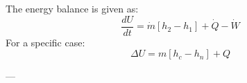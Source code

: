 The energy balance is given as:  
\[
\frac{dU}{dt} = \dot{m} \left[ h_2 - h_1 \right] + \dot{Q} - \dot{W}
\]  
For a specific case:  
\[
\Delta U = m \left[ h_c - h_n \right] + Q
\]  

---